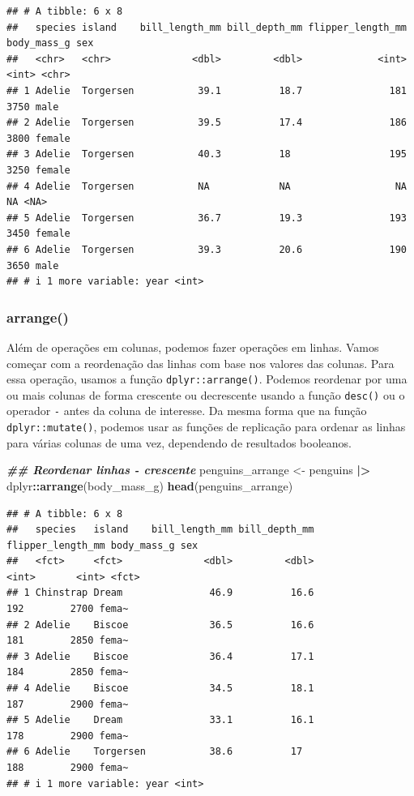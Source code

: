 \documentclass[
]{article}
\newenvironment{Shaded}{\begin{snugshade}}{\end{snugshade}}
\newcommand{\DocumentationTok}[1]{\textcolor[rgb]{0.56,0.35,0.01}{\textbf{\textit{#1}}}}
\newcommand{\FunctionTok}[1]{\textcolor[rgb]{0.13,0.29,0.53}{\textbf{#1}}}
\newcommand{\NormalTok}[1]{#1}
\newcommand{\OtherTok}[1]{\textcolor[rgb]{0.56,0.35,0.01}{#1}}
\newcommand{\SpecialCharTok}[1]{\textcolor[rgb]{0.81,0.36,0.00}{\textbf{#1}}}
\begin{document}
\begin{verbatim}
## # A tibble: 6 x 8
##   species island    bill_length_mm bill_depth_mm flipper_length_mm body_mass_g sex   
##   <chr>   <chr>              <dbl>         <dbl>             <int>       <int> <chr> 
## 1 Adelie  Torgersen           39.1          18.7               181        3750 male  
## 2 Adelie  Torgersen           39.5          17.4               186        3800 female
## 3 Adelie  Torgersen           40.3          18                 195        3250 female
## 4 Adelie  Torgersen           NA            NA                  NA          NA <NA>  
## 5 Adelie  Torgersen           36.7          19.3               193        3450 female
## 6 Adelie  Torgersen           39.3          20.6               190        3650 male  
## # i 1 more variable: year <int>
\end{verbatim}

\hypertarget{arrange}{%
\subsubsection{arrange()}\label{arrange}}

Além de operações em colunas, podemos fazer operações em linhas. Vamos começar com a reordenação das linhas com base nos valores das colunas. Para essa operação, usamos a função \texttt{dplyr::arrange()}. Podemos reordenar por uma ou mais colunas de forma crescente ou decrescente usando a função \texttt{desc()} ou o operador \texttt{-} antes da coluna de interesse. Da mesma forma que na função \texttt{dplyr::mutate()}, podemos usar as funções de replicação para ordenar as linhas para várias colunas de uma vez, dependendo de resultados booleanos.

\begin{Shaded}
\begin{Highlighting}[]
\DocumentationTok{\#\# Reordenar linhas {-} crescente}
\NormalTok{penguins\_arrange }\OtherTok{\textless{}{-}}\NormalTok{ penguins }\SpecialCharTok{|\textgreater{}} 
\NormalTok{    dplyr}\SpecialCharTok{::}\FunctionTok{arrange}\NormalTok{(body\_mass\_g)}
\FunctionTok{head}\NormalTok{(penguins\_arrange)}
\end{Highlighting}
\end{Shaded}

\begin{verbatim}
## # A tibble: 6 x 8
##   species   island    bill_length_mm bill_depth_mm flipper_length_mm body_mass_g sex  
##   <fct>     <fct>              <dbl>         <dbl>             <int>       <int> <fct>
## 1 Chinstrap Dream               46.9          16.6               192        2700 fema~
## 2 Adelie    Biscoe              36.5          16.6               181        2850 fema~
## 3 Adelie    Biscoe              36.4          17.1               184        2850 fema~
## 4 Adelie    Biscoe              34.5          18.1               187        2900 fema~
## 5 Adelie    Dream               33.1          16.1               178        2900 fema~
## 6 Adelie    Torgersen           38.6          17                 188        2900 fema~
## # i 1 more variable: year <int>
\end{verbatim}
\end{document}
